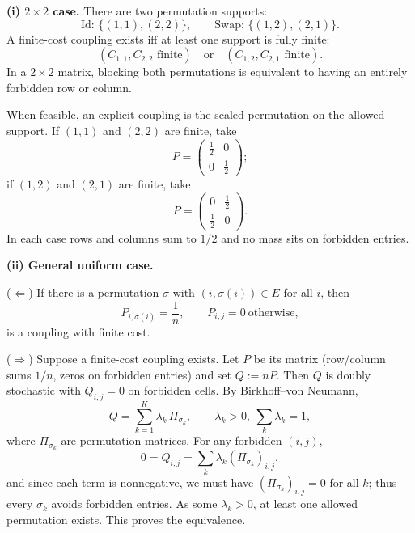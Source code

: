 \documentclass[11pt,a4paper]{article}
\theoremstyle{exostyle}
\begin{document}
\begin{solution}
\textbf{(i) $2\times2$ case.}
There are two permutation supports:
\[
\text{Id: }\{(1,1),(2,2)\},\qquad \text{Swap: }\{(1,2),(2,1)\}.
\]
A finite-cost coupling exists iff at least one support is fully finite:
\[
(C_{1,1},C_{2,2}\text{ finite})\quad\text{or}\quad(C_{1,2},C_{2,1}\text{ finite}).
\]
In a $2\times2$ matrix, blocking both permutations is equivalent to having an entirely forbidden row or column.

When feasible, an explicit coupling is the scaled permutation on the allowed support. If $(1,1)$ and $(2,2)$ are finite, take
\[
P=\begin{pmatrix}\tfrac12&0\\[2pt]0&\tfrac12\end{pmatrix};
\]
if $(1,2)$ and $(2,1)$ are finite, take
\[
P=\begin{pmatrix}0&\tfrac12\\[2pt]\tfrac12&0\end{pmatrix}.
\]
In each case rows and columns sum to $1/2$ and no mass sits on forbidden entries.

\medskip
\par{}
\textbf{(ii) General uniform case.}

($\Leftarrow$) If there is a permutation $\sigma$ with $(i,\sigma(i))\in E$ for all $i$, then
\[
P_{i,\sigma(i)}=\frac1n,\qquad P_{i,j}=0\ \text{otherwise},
\]
is a coupling with finite cost.

($\Rightarrow$) Suppose a finite-cost coupling exists. Let $P$ be its matrix (row/column sums $1/n$, zeros on forbidden entries) and set $Q:=nP$. Then $Q$ is doubly stochastic with $Q_{i,j}=0$ on forbidden cells. By Birkhoff--von Neumann,
\[
Q=\sum_{k=1}^K \lambda_k\,\Pi_{\sigma_k},\qquad \lambda_k>0,\ \sum_k\lambda_k=1,
\]
where $\Pi_{\sigma_k}$ are permutation matrices. For any forbidden $(i,j)$,
\[
0=Q_{i,j}=\sum_k \lambda_k (\Pi_{\sigma_k})_{i,j},
\]
and since each term is nonnegative, we must have $(\Pi_{\sigma_k})_{i,j}=0$ for all $k$; thus every $\sigma_k$ avoids forbidden entries. As some $\lambda_k>0$, at least one allowed permutation exists. This proves the equivalence.
\end{solution}
\end{document}
